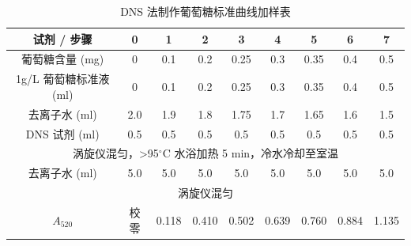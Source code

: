 \documentclass[10.5pt, a4paper]{ctexart}
\begin{document}
\begin{table}[H]
\centering
\caption{DNS 法制作葡萄糖标准曲线加样表}
\begin{tabular}{ccccccccc}
\toprule
\textbf{试剂 / 步骤} & \textbf{0} & \textbf{1} & \textbf{2} & \textbf{3} & \textbf{4} & \textbf{5} & \textbf{6} & \textbf{7} \\
\midrule
葡萄糖含量 (mg) & 0 & 0.1 & 0.2 & 0.25 & 0.3 & 0.35 & 0.4 & 0.5 \\
1g/L 葡萄糖标准液 (ml) & 0 & 0.1 & 0.2 & 0.25 & 0.3 & 0.35 & 0.4 & 0.5 \\
去离子水 (ml) & 2.0 & 1.9 & 1.8 & 1.75 & 1.7 & 1.65 & 1.6 & 1.5 \\
DNS 试剂 (ml) & 0.5 & 0.5 & 0.5 & 0.5 & 0.5 & 0.5 & 0.5 & 0.5 \\
\midrule
\multicolumn{9}{c}{涡旋仪混匀，>95$^{\circ}$C 水浴加热 5 min，冷水冷却至室温} \\
\midrule
去离子水 (ml) & 5.0 & 5.0 & 5.0 & 5.0 & 5.0 & 5.0 & 5.0 & 5.0 \\
\midrule
\multicolumn{9}{c}{涡旋仪混匀} \\
\midrule
$A_{520}$ & 校零 & 0.118 & 0.410 & 0.502 & 0.639 & 0.760 & 0.884 & 1.135 \\
\bottomrule
\end{tabular}
\label{tab:dns_std_appendix}
\end{table}
\end{document}
